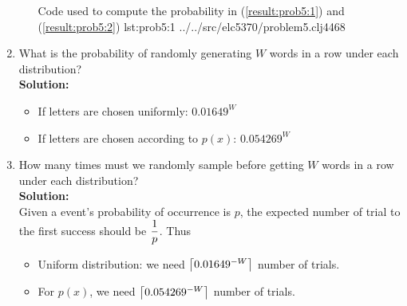 \documentclass{assignment}
\begin{document}
\begin{enumerate}
\begin{itemize}
      {Code used to compute the probability in (\ref{result:prob5:1}) and (\ref{result:prob5:2})}
      {lst:prob5:1}
      {../../src/elc5370/problem5.clj}{44}{68}

  \end{itemize}


\item What is the probability of randomly generating $W$ words in a row under each distribution?\\
  \textbf{Solution:}\\
  \begin{itemize}
  \item If letters are chosen uniformly: $0.01649^W$
  \item If letters are chosen according to $p(x)$: $0.054269^W$
  \end{itemize}

\item How many times must we randomly sample before getting $W$ words in a row under each distribution? \\
  \textbf{Solution:} \\
  Given a event's probability of occurrence is $p$, the expected number of trial to the first success should be
  $\dfrac{1}{p}$. Thus
  \begin{itemize}
    \item Uniform distribution: we need $\left \lceil 0.01649^{-W} \right \rceil$ number of trials.
    \item For $p(x)$, we need $\left \lceil 0.054269^{-W} \right \rceil$ number of trials.
  \end{itemize}


\end{enumerate}
\end{document}
